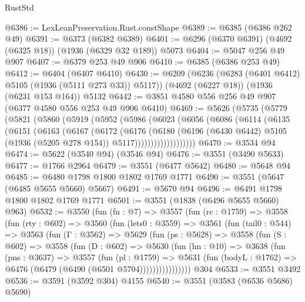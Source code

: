 \begin{lexlean}{RustStd}
\begin{coremodule}
@6386 := LexLeanPreservation.Rust.constShape
@6389 := @6385 (@6386 @262 @49)
@6391 := @6373 (@6382 @6389)
@6401 := @6296 (@6370 @6391) (@4692 (@6325 @18)) (@1936 (@6329 @32 @189)) @5073
@6404 := @5047 @256 @49 @907
@6407 := @6379 @253 @49 @906
@6410 := @6385 (@6386 @253 @49)
@6412 := @6404 (@6407 @6410)
@6430 := @6209
    (@6236 (@6283 (@6401 @6412) @5105 (@1936 (@5111 @273 @33)) @5117))
    (@4692 (@6227 @18))
    (@1936 (@6231 @153 @164))
    @5132
@6442 := @3851 @4580 @556 @256 @49 @907 (@6377 @4580 @556 @253 @49 @906 @6410)
@6469 := @5626
    (@5735
      (@5779
        (@5821
          (@5860
            (@5919
              (@5952
                (@5986
                  (@6023
                    (@6056
                      (@6086
                        (@6114
                          (@6135
                            (@6151
                              (@6163
                                (@6167
                                  (@6172
                                    (@6176
                                      (@6180
                                        (@6196
                                          (@6430 @6442)
                                          @5105
                                          (@1936 (@5205 @278 @154))
                                          @5117)))))))))))))))))))
@6470 := @3534 @94
@6474 := @5622 (@3540 @94) (@3546 @94)
@6476 := @3551 (@3490 @5633)
@6477 := @1766 @2964
@6479 := @3551 (@6477 @5642)
@6480 := @5648 @94
@6485 := @6480 @1798 @1800 @1802 @1769 @1771
@6490 := @3551 (@5647 (@6485 @5655 @5660) @5667)
@6491 := @5670 @94
@6496 := @6491 @1798 @1800 @1802 @1769 @1771
@6501 := @3551 (@1838 (@6496 @5655 @5660) @963)
@6532 := @3550
    (fun (fn : @7) =>
    @3557
      (fun (rc : @1759) =>
      @3558
        (fun (rty : @602) =>
        @3560
          (fun (lets0 : @3559) =>
          @3561
            (fun (tail0 : @544) =>
            @3563
              (fun (Γ : @3562) =>
              @5629
                (fun (ps : @5628) =>
                @3558
                  (fun (S : @602) =>
                  @3558
                    (fun (D : @602) =>
                    @5630
                      (fun (hn : @10) =>
                      @3638
                        (fun (pns : @3637) =>
                        @3557
                          (fun (pl : @1759) =>
                          @5631
                            (fun (bodyL : @1762) => @6476 (@6479 (@6490 (@6501 @5704))))))))))))))))
    @304
@6533 := @3551 @3492
@6536 := @3591 (@3592 @304) @4155
@6540 := @3551 (@3583 (@6536 @5686) @5690)

\end{coremodule}
\end{lexlean}
